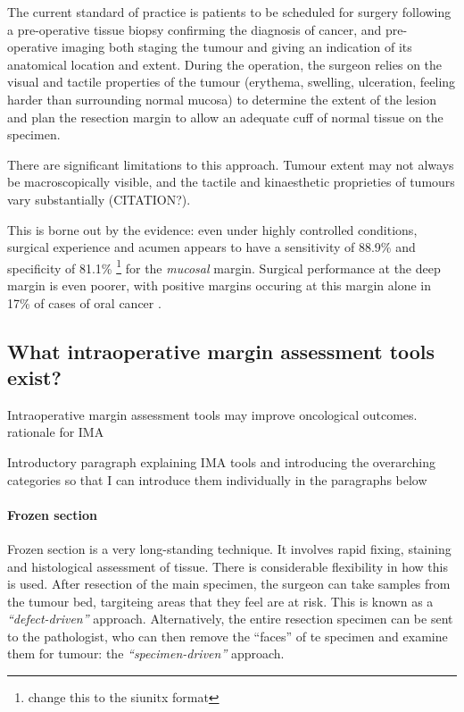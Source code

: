 The current standard of practice is patients to be scheduled for surgery following a pre-operative tissue biopsy confirming the diagnosis of cancer, and pre-operative imaging both staging the tumour and giving an indication of its anatomical location and extent.
During the operation, the surgeon relies on the visual and tactile properties of the tumour (erythema, swelling, ulceration, feeling harder than surrounding normal mucosa) to determine the extent of the lesion and plan the resection margin to allow an adequate cuff of normal tissue on the specimen.

There are significant limitations to this approach. 
Tumour extent may not always be macroscopically visible, and the tactile and kinaesthetic proprieties of tumours vary substantially (CITATION?).

This is borne out by the evidence: even under highly controlled conditions, surgical experience and acumen appears to have a sensitivity of 88.9\% and specificity of 81.1\% \footnote{change this to the siunitx format} \cite{chaturvedip.GrossExaminationSurgeon2014} for the \emph{mucosal} margin.
Surgical performance at the deep margin is even poorer, with positive margins occuring at this margin alone in 17\% of cases of oral cancer \cite{woolgarHistopathologicalAppraisalSurgical2005}.

\subsection{What intraoperative margin assessment tools exist?}

Intraoperative margin assessment tools may improve oncological outcomes.
rationale for IMA

Introductory paragraph explaining IMA tools and introducing the overarching categories so that I can introduce them individually in the paragraphs below

\paragraph{Frozen section}

Frozen section is a very long-standing technique.
It involves rapid fixing, staining and histological assessment of tissue.
There is considerable flexibility in how this is used.
After resection of the main specimen, the surgeon can take samples from the tumour bed, targiteing areas that they feel are at risk.
This is known as a \emph{``defect-driven''} approach.
Alternatively, the entire resection specimen can be sent to the pathologist, who can then remove the ``faces'' of te specimen and examine them for tumour: the \emph{``specimen-driven''} approach.

